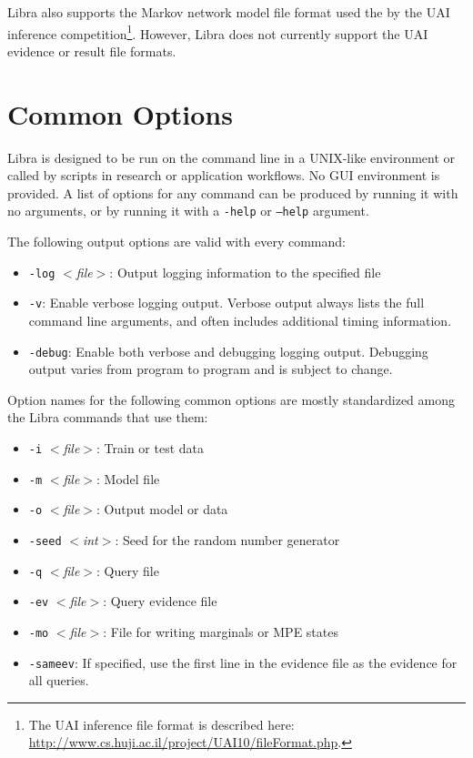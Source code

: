 \documentclass[11pt]{article}
\begin{document}
Libra also supports the Markov network model file format used the by
the UAI inference competition\footnote{The UAI inference file format
is described here:
\url{http://www.cs.huji.ac.il/project/UAI10/fileFormat.php}.}.
However, Libra does not currently support the UAI evidence or result
file formats.

\section{Common Options}

Libra is designed to be run on the command line in a
UNIX-like environment or called by scripts in research or application
workflows.  No GUI environment is provided.  A list of options for any
command can be produced by running it with no arguments, or by
running it with a {\tt -help} or {\tt --help} argument.

The following output options are valid with every command:
\begin{itemize}
\item[] {\tt -log} {\em $<$file$>$}: Output logging information to the specified file
\item[] {\tt -v}: Enable verbose logging output.  Verbose output always
lists the full command line arguments, and often includes additional
timing information.
\item[] {\tt -debug}: Enable both verbose and debugging logging output.
Debugging output varies from program to program and is subject to
change.
\end{itemize}

Option names for the following common options are mostly standardized among
the Libra commands that use them:
\begin{itemize}
\item[] {\tt -i} {\em $<$file$>$}: Train or test data
\item[] {\tt -m} {\em $<$file$>$}: Model file
\item[] {\tt -o} {\em $<$file$>$}: Output model or data
\item[] {\tt -seed} {\em $<$int$>$}: Seed for the random number generator
\item[] {\tt -q} {\em $<$file$>$}: Query file
\item[] {\tt -ev} {\em $<$file$>$}: Query evidence file
\item[] {\tt -mo} {\em $<$file$>$}: File for writing marginals or MPE states
\item[] {\tt -sameev}: If specified, use the first line in the evidence
file as the evidence for all queries.
\end{itemize}
\end{document}
